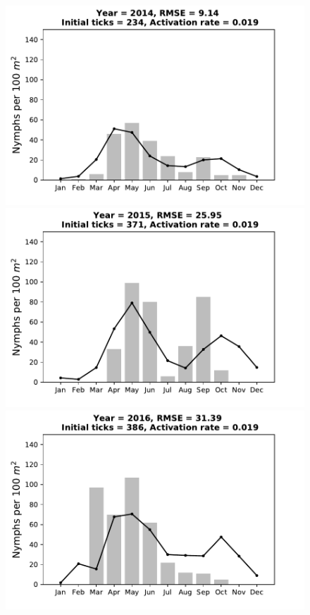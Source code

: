 \documentclass[a4paper, 11pt]{scrartcl}
\begin{document}
\begin{figure}[h!]
\begin{minipage}[c]{0.40\linewidth}
\end{minipage}
\begin{minipage}[c]{0.40\linewidth}
\includegraphics[width=\linewidth]{figures/s5/s5_2014}
\end{minipage}
\begin{minipage}[c]{0.40\linewidth}
\includegraphics[width=\linewidth]{figures/s5/s5_2015}
\end{minipage}
\begin{minipage}[c]{0.40\linewidth}
\includegraphics[width=\linewidth]{figures/s5/s5_2016}

\end{minipage}
\end{figure}
\end{document}
